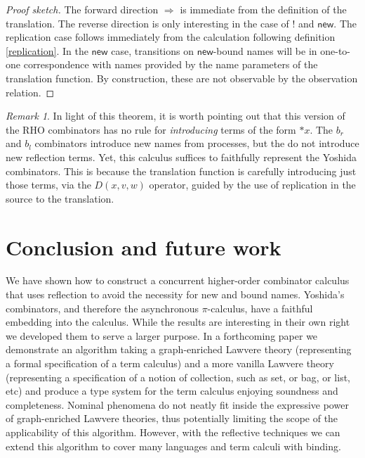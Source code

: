 \documentclass[submission,copyright,creativecommons]{eptcs}
\newcommand{\new}{\mathsf{new}}
\newcommand{\pic}{$\pi$-calculus}
\newcommand{\dropn}[1]{\mathsf{*}#1}
\theoremstyle{definition}
\theoremstyle{remark}
\newtheorem{remark}{Remark}
\theoremstyle{remark}
\begin{document}
\begin{proof}[Proof sketch]
  The forward direction $\Rightarrow$ is immediate from the definition
  of the translation. The reverse direction is only interesting in the
  case of $!$ and $\mathsf{new}$. The replication case follows immediately
  from the calculation following definition \ref{replication}. 
  In the $\new$ case, transitions on $\mathsf{new}$-bound
  names will be in one-to-one correspondence with names provided by
  the name parameters of the translation function. By construction,
  these are not observable by the observation relation.
\end{proof}

\begin{remark}
  In light of this theorem, it is worth pointing out that this version
  of the RHO combinators has no rule for \emph{introducing} terms of
  the form $\dropn{x}$. The $b_r$ and $b_l$ combinators introduce new
  names from processes, but the do not introduce new reflection
  terms. Yet, this calculus suffices to faithfully represent the
  Yoshida combinators. This is because the translation function is
  carefully introducing just those terms, via the $D(x,v,w)$ operator,
  guided by the use of replication in the source to the
  translation. 
\end{remark}

\section{Conclusion and future work}
We have shown how to construct a concurrent higher-order combinator
calculus that uses reflection to avoid the necessity for new and bound
names.  Yoshida's combinators, and therefore the asynchronous {\pic},
have a faithful embedding into the calculus. While the results are
interesting in their own right we developed them to serve a larger
purpose. In a forthcoming paper we demonstrate an algorithm taking a
graph-enriched Lawvere theory (representing a formal specification of
a term calculus) and a more vanilla Lawvere theory (representing a
specification of a notion of collection, such as set, or bag, or list,
etc) and produce a type system for the term calculus enjoying
soundness and completeness. Nominal phenomena do not neatly fit inside
the expressive power of graph-enriched Lawvere theories, thus
potentially limiting the scope of the applicability of this
algorithm. However, with the reflective techniques we can extend this
algorithm to cover many languages and term calculi with binding.
\end{document}

